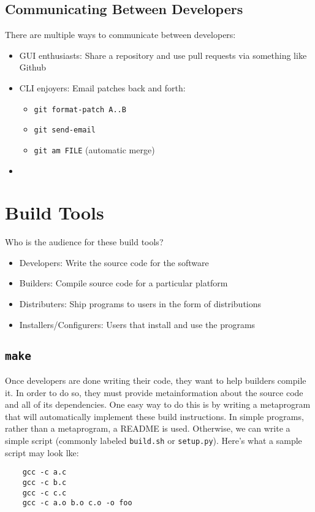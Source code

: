 \documentclass[13pt]{article}
\begin{document}
\subsection{Communicating Between Developers}
There are multiple ways to communicate between developers:
\begin{itemize}[label=]
\item GUI enthusiasts: Share a repository and use pull requests via something like Github
\item CLI enjoyers: Email patches back and forth:
  \begin{itemize}[label=]
  \item \texttt{git format-patch A..B}
  \item \texttt{git send-email}
  \item \texttt{git am FILE} (automatic merge)
  \end{itemize}
\item 

\end{itemize}





\section{Build Tools}
Who is the audience for these build tools?
\begin{itemize}[label=]
\item Developers: Write the source code for the software
\item Builders: Compile source code for a particular platform
\item Distributers: Ship programs to users in the form of distributions
\item Installers/Configurers: Users that install and use the programs
\end{itemize}





\subsection{\texttt{make}}
Once developers are done writing their code, they want to help builders compile it. In order to do so, they must provide metainformation about the source code and all of its dependencies. One easy way to do this is by writing a metaprogram that will automatically implement these build instructions. In simple programs, rather than a metaprogram, a README is used. Otherwise, we can write a simple script (commonly labeled \texttt{build.sh} or \texttt{setup.py}). Here's what a sample script may look lke:
\begin{verbatim}
    gcc -c a.c
    gcc -c b.c
    gcc -c c.c
    gcc -c a.o b.o c.o -o foo
\end{verbatim}
\end{document}
